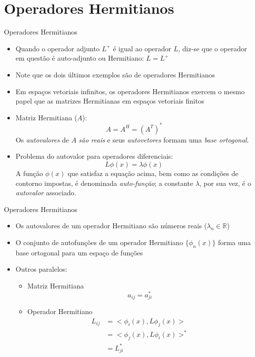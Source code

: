    \section[ slide = true ]{Operadores Hermitianos}
      \begin{slide}[toc=]{Operadores Hermitianos}
	      \begin{itemize}
		      \item Quando o operador adjunto $L^+$ é igual ao operador $L$, diz-se que o operador em questão é auto-adjunto ou Hermitiano: $L = L^+$
		      \item Note que os dois últimos exemplos são de operadores Hermitianos
		      \item Em espaços vetoriais infinitos, os operadores Hermitianos exercem o mesmo papel que as matrizes Hermitianas em espaços vetoriais finitos 
		      \item Matriz Hermitiana ($A$):
			      \begin{equation*}
				      A = A^H = (A^T)^\ast
			      \end{equation*}
			      Os \emph{autovalores} de $A$ \emph{são reais} e seus \emph{autovetores} formam uma \emph{base ortogonal}.
		      \item Problema do autovalor para operadores diferenciais:
			      \begin{equation*}
				      L\phi(x) = \lambda \phi(x)
			      \end{equation*}
			      A função $\phi(x)$ que satisfaz a equação acima, bem como as condições de contorno impostas, é denominada \emph{auto-função}; a constante $\lambda$, por sua vez, é o \emph{autovalor} associado. 
	      \end{itemize}
      \end{slide}

      \begin{slide}[toc=]{Operadores Hermitianos}
	      \begin{itemize}
		      \item Os autovalores de um operador Hermitiano são números reais ($\lambda_n \in \mathbb R$)
		      \item O conjunto de autofunções de um operador Hermitiano $\{ \phi_n(x) \}$ forma uma base ortogonal para um espaço de funções
		      \item Outros paralelos:
			      \begin{itemize}
				      \item Matriz Hermitiana
					      \begin{equation*}
						      a_{ij} = a_{ji}^\ast
					      \end{equation*}
				      \item Operador Hermitiano
					      \begin{align*}
						      L_{ij} &= <\phi_i(x),L\phi_j(x)>\\
						             &= <\phi_j(x),L\phi_i(x)>^\ast\\
							     &= L_{ji}^\ast
					      \end{align*}
			      \end{itemize}
	      \end{itemize}
      \end{slide}
   

